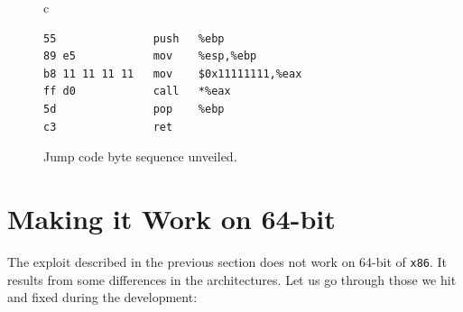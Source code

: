 \documentclass[10pt]{llncs}
\begin{document}
\begin{figure}[htb]
  \begin{center}
    \begin{tabular}{c}
\begin{lstlisting}[language={[x86masm]Assembler}]
55               push   %ebp
89 e5            mov    %esp,%ebp
b8 11 11 11 11   mov    $0x11111111,%eax
ff d0            call   *%eax
5d               pop    %ebp
c3               ret    
\end{lstlisting} %
    \end{tabular}
  \end{center}
  \caption{Jump code byte sequence unveiled.}
  \label{fig:jump_code}
\end{figure}

\section{Making it Work on 64-bit} \label{sec:work}
The exploit described in the previous section does not work on 64-bit of
\texttt{x86}. It results from some differences in the architectures. Let us go
through those we hit and fixed during the development:
\end{document}
